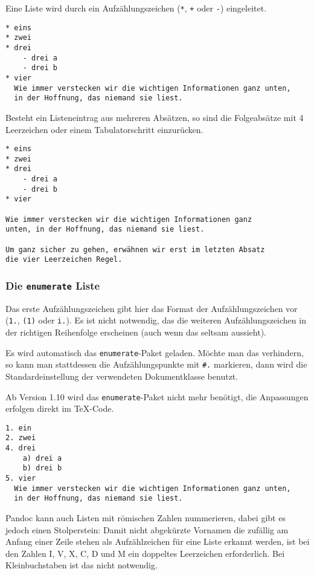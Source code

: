 \documentclass[11pt,ngerman,a4paper]{article}
\begin{document}
Eine Liste wird durch ein Aufzählungszeichen (\texttt{*}, \texttt{+}
oder \texttt{-}) eingeleitet.

\begin{verbatim}
* eins
* zwei
* drei
    - drei a
    - drei b
* vier
  Wie immer verstecken wir die wichtigen Informationen ganz unten,
  in der Hoffnung, das niemand sie liest.
\end{verbatim}

Besteht ein Listeneintrag aus mehreren Absätzen, so sind die
Folgeabsätze mit 4 Leerzeichen oder einem Tabulatorschritt einzurücken.

\begin{verbatim}
* eins
* zwei
* drei
    - drei a
    - drei b
* vier

Wie immer verstecken wir die wichtigen Informationen ganz
unten, in der Hoffnung, das niemand sie liest.
    
Um ganz sicher zu gehen, erwähnen wir erst im letzten Absatz
die vier Leerzeichen Regel.
\end{verbatim}

\subsubsection{Die \texttt{enumerate} Liste}\label{die-enumerate-liste}

Das erste Aufzählungszeichen gibt hier das Format der Aufzählungszeichen
vor (\texttt{1.}, \texttt{(1)} oder \texttt{i.}). Es ist nicht
notwendig, das die weiteren Aufzählungszeichen in der richtigen
Reihenfolge erscheinen (auch wenn das seltsam aussieht).

Es wird automatisch das \texttt{enumerate}-Paket geladen. Möchte man das
verhindern, so kann man stattdessen die Aufzählungspunkte mit
\texttt{\#.} markieren, dann wird die Standardeinstellung der
verwendeten Dokumentklasse benutzt.

Ab Version 1.10 wird das \texttt{enumerate}-Paket nicht mehr benötigt,
die Anpassungen erfolgen direkt im TeX-Code.

\begin{verbatim}
1. ein
2. zwei
4. drei
    a) drei a
    b) drei b
5. vier
  Wie immer verstecken wir die wichtigen Informationen ganz unten,
  in der Hoffnung, das niemand sie liest.
\end{verbatim}

Pandoc kann auch Listen mit römischen Zahlen nummerieren, dabei gibt es
jedoch einen Stolperstein: Damit nicht abgekürzte Vornamen die zufällig
am Anfang einer Zeile stehen als Aufzählzeichen für eine Liste erkannt
werden, ist bei den Zahlen I, V, X, C, D und M ein doppeltes Leerzeichen
erforderlich. Bei Kleinbuchstaben ist das nicht notwendig.
\end{document}
